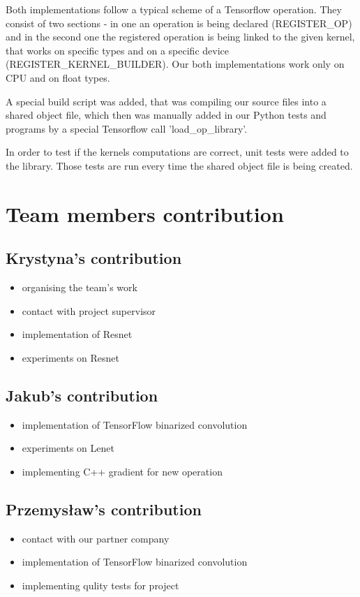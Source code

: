 \documentclass[licencjacka]{pracamgr}
\begin{document}
		Both implementations follow a typical scheme of a Tensorflow operation. They consist of two sections - in one an operation is being declared (REGISTER\_OP) and in the second one the registered operation is being linked to the given kernel, that works on specific types and on a specific device (REGISTER\_KERNEL\_BUILDER). Our both implementations work only on CPU and on float types. 

		A special build script was added, that was compiling our source files into a shared object file, which then was manually added in our Python tests and programs by a special Tensorflow call 'load\_op\_library'.

		In order to test if the kernels computations are correct, unit tests were added to the library. Those tests are run every time the shared object file is being created.
	
	\chapter{Team members contribution}
	\section{Krystyna's contribution}
		\begin{itemize}
			\item organising the team's work
			\item contact with project supervisor
			\item implementation of Resnet
			\item experiments on Resnet
		\end{itemize}
	\section{Jakub's contribution}
		\begin{itemize}
			\item implementation of TensorFlow binarized convolution
			\item experiments on Lenet
			\item implementing C++ gradient for new operation
		\end{itemize}
	\section{Przemysław's contribution}
		\begin{itemize}
			\item contact with our partner company
			\item implementation of TensorFlow binarized convolution
			\item implementing qulity tests for project
		\end{itemize}
\end{document}
